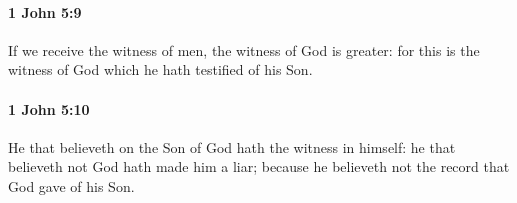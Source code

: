 		\paragraph{1 John 5:9} %
			\label{1JOHN-5-9}

			If we receive the witness of men, the witness of God is greater: for this is the witness of God which he hath testified of his Son.

			\begin{framed}
			\scriptsize
				\begin{compactdesc}
					\item[SBLG] 
				\end{compactdesc}
			\end{framed}

		\paragraph{1 John 5:10} %
			\label{1JOHN-5-10}

			He that believeth on the Son of God hath the witness in himself: he that believeth not God hath made him a liar; because he believeth not the record that God gave of his Son.

